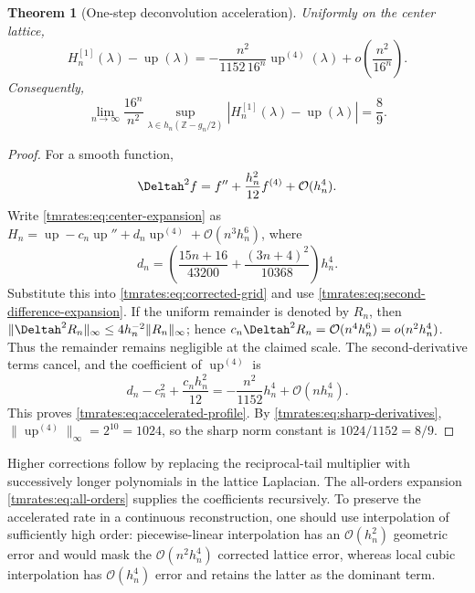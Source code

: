\documentclass[11pt,oneside]{article}
\newtheorem{theorem}{Theorem}[section]
\theoremstyle{definition}
\theoremstyle{remark}
\newcommand{\Z}{\mathbb Z}
\newcommand{\Up}{\operatorname{up}}
\newcommand{\bigO}{\mathcal O}
\newcommand{\smallo}{o}
\begin{document}
\begin{theorem}[One-step deconvolution acceleration]
\label{tmrates:thm:accelerated}
Uniformly on the center lattice,
\begin{equation}
 H_n^{[1]}(\lambda)-\Up(\lambda)
 =-\frac{n^2}{1152\,16^n}\Up^{(4)}(\lambda)
  +\smallo\!\left(\frac{n^2}{16^n}\right).                \label{tmrates:eq:accelerated-profile}
\end{equation}
Consequently,
\begin{equation}
 \lim_{n\to\infty}\frac{16^n}{n^2}
 \sup_{\lambda\in h_n(\Z-g_n/2)}
 |H_n^{[1]}(\lambda)-\Up(\lambda)|
 =\frac89.                                                 \label{tmrates:eq:accelerated-norm}
\end{equation}
\end{theorem}

\begin{proof}
For a smooth function,
\begin{equation}
 \Deltah^2f=f''+\frac{h_n^2}{12}f^{(4)}+\bigO(h_n^4).      \label{tmrates:eq:second-difference-expansion}
\end{equation}
Write \eqref{tmrates:eq:center-expansion} as
$H_n=\Up-c_n\Up''+d_n\Up^{(4)}+\bigO(n^3h_n^6)$, where
\[
 d_n=\left(\frac{15n+16}{43200}
          +\frac{(3n+4)^2}{10368}\right)h_n^4.
\]
Substitute this into \eqref{tmrates:eq:corrected-grid} and use
\eqref{tmrates:eq:second-difference-expansion}.  If the uniform remainder is denoted by $R_n$, then
$\|\Deltah^2R_n\|_\infty\le4h_n^{-2}\|R_n\|_\infty$; hence
$c_n\Deltah^2R_n=\bigO(n^4h_n^6)=\smallo(n^2h_n^4)$.  Thus the remainder remains negligible
at the claimed scale.  The second-derivative terms cancel, and the coefficient of
$\Up^{(4)}$ is
\begin{equation*}
 d_n-c_n^2+\frac{c_nh_n^2}{12}
 =-\frac{n^2}{1152}h_n^4+\bigO(nh_n^4).
\end{equation*}
This proves \eqref{tmrates:eq:accelerated-profile}.  By \eqref{tmrates:eq:sharp-derivatives},
$\|\Up^{(4)}\|_\infty=2^{10}=1024$, so the sharp norm constant is
$1024/1152=8/9$.
\end{proof}

Higher corrections follow by replacing the reciprocal-tail multiplier with successively
longer polynomials in the lattice Laplacian.  The all-orders expansion
\eqref{tmrates:eq:all-orders} supplies the coefficients recursively.  To preserve the accelerated
rate in a continuous reconstruction, one should use interpolation of sufficiently high order:
piecewise-linear interpolation has an $\bigO(h_n^2)$ geometric error and would mask the
$\bigO(n^2h_n^4)$ corrected lattice error, whereas local cubic interpolation has
$\bigO(h_n^4)$ error and retains the latter as the dominant term.
\end{document}
